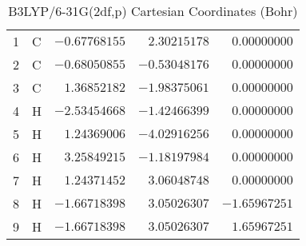 \documentclass[10pt,oneside]{article}
\begin{document}
\begin{table}[h]
\centering
\caption{B3LYP/6-31G(2df,p) Cartesian Coordinates (Bohr)}
\begin{tabular}{llrrr}
\toprule
1  & C  & $-0.67768155$ & $ 2.30215178$ & $ 0.00000000$ \\
2  & C  & $-0.68050855$ & $-0.53048176$ & $ 0.00000000$ \\
3  & C  & $ 1.36852182$ & $-1.98375061$ & $ 0.00000000$ \\
4  & H  & $-2.53454668$ & $-1.42466399$ & $ 0.00000000$ \\
5  & H  & $ 1.24369006$ & $-4.02916256$ & $ 0.00000000$ \\
6  & H  & $ 3.25849215$ & $-1.18197984$ & $ 0.00000000$ \\
7  & H  & $ 1.24371452$ & $ 3.06048748$ & $ 0.00000000$ \\
8  & H  & $-1.66718398$ & $ 3.05026307$ & $-1.65967251$ \\
9  & H  & $-1.66718398$ & $ 3.05026307$ & $ 1.65967251$ \\
\bottomrule
\end{tabular}
\end{table}
\end{document}
